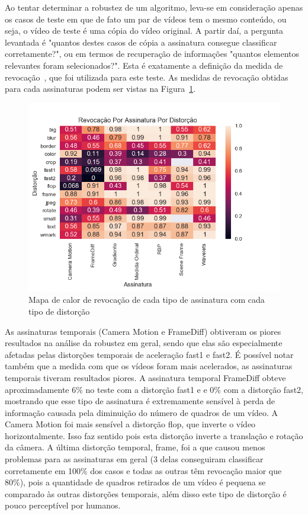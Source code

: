 Ao tentar determinar a robustez de um algoritmo, leva-se em consideração apenas os casos de teste em que de fato um par de vídeos tem o mesmo conteúdo, ou seja, o vídeo de teste é uma cópia do vídeo original. A partir daí, a pergunta levantada é "quantos destes casos de cópia a assinatura consegue classificar corretamente?", ou em termos de recuperação de informações "quantos elementos relevantes foram selecionados?". Esta é exatamente a definição da medida de revocação~\cite{Ting2010}, que foi utilizada para este teste. As medidas de revocação obtidas para cada assinaturas podem ser vistas na Figura~\ref{fig:heatmap-revocacao}.


\begin{figure}[h]
	\centering
	\caption{Mapa de calor de revocação de cada tipo de assinatura com cada tipo de distorção}
	\label{fig:heatmap-revocacao}
	\includegraphics[width=\textwidth]{dados/figuras/experimentos/heatmap_final_recall.png}	
\end{figure}

As assinaturas temporais (Camera Motion e FrameDiff) obtiveram os piores resultados na análise da robustez em geral, sendo que elas são especialmente afetadas pelas distorções temporais de aceleração fast1 e fast2. É possível notar também que a medida com que os vídeos foram mais acelerados, as assinaturas temporais tiveram resultados piores. A assinatura temporal FrameDiff obteve aproximadamente 6\% no teste com a distorção fast1 e e 0\% com a distorção fast2, mostrando que esse tipo de assinatura é extremamente sensível à perda de informação causada pela diminuição do número de quadros de um vídeo. A Camera Motion foi mais sensível a distorção flop, que inverte o vídeo horizontalmente. Isso faz sentido pois esta distorção inverte a translação e rotação da câmera. A última distorção temporal, frame, foi a que causou menos problemas para as assinaturas em geral (3 delas conseguiram classificar corretamente em 100\% dos casos e todas as outras têm revocação maior que 80\%), pois a quantidade de quadros retirados de um vídeo é pequena se comparado às outras distorções temporais, além disso este tipo de distorção é pouco perceptível por humanos.

